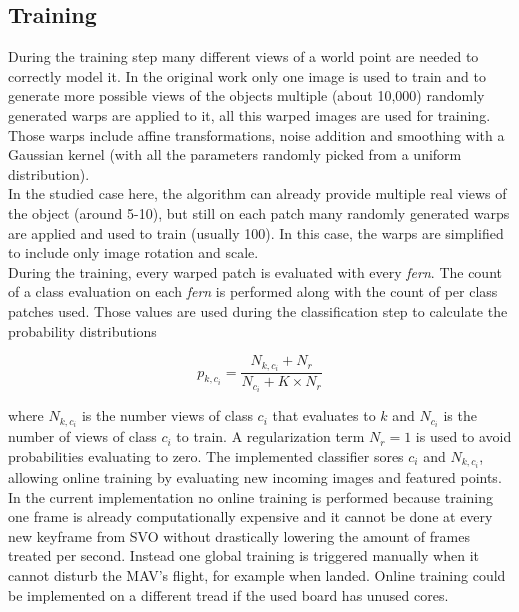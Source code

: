 \subsection{Training}
\label{sub:training}

During the training step many different views of a world point are needed to correctly model it. In the original work \cite{Ozuysal2010} only one image is used to train and to generate more possible views of the objects multiple (about 10,000) randomly generated warps are applied to it, all this warped images are used for training. Those warps include affine transformations, noise addition and smoothing with a Gaussian kernel (with all the parameters randomly picked from a uniform distribution).\\

In the studied case here, the algorithm can already provide multiple real views of the object (around 5-10), but still on each patch many randomly generated warps are applied and used to train (usually 100). In this case, the warps are simplified to include only image rotation and scale.\\

During the training, every warped patch is evaluated with every \textit{fern}. The count of a class evaluation on each \textit{fern} is performed along with the count of per class patches used. Those values are used during the classification step to calculate the probability distributions

\begin{equation}
  p_{k,c_i} = \frac{N_{k,c_i} + N_r}{N_{c_i} + K \times N_r}
\end{equation}

where $N_{k,c_i}$ is the number views of class $c_i$ that evaluates to $k$ and $N_{c_i}$ is the number of views of class $c_i$ to train. A regularization term $N_r = 1$ is used to avoid probabilities evaluating to zero. The implemented classifier sores $c_i$  and $N_{k,c_i}$, allowing online training by evaluating new incoming images and featured points.\\

In the current implementation no online training is performed because training one frame is already computationally expensive and it cannot be done at every new keyframe from SVO without drastically lowering the amount of frames treated per second. Instead one global training is triggered manually when it cannot disturb the MAV's flight, for example when landed. Online training could be implemented on a different tread if the used board has unused cores.\\


